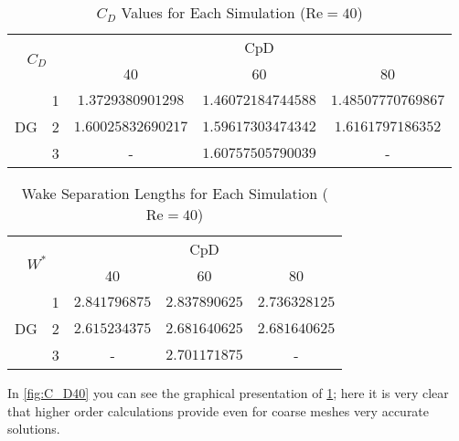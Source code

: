 \begin{table}[htp]
	\centering
	\def\arraystretch{1.5}
		\begin{tabular}{|c|c|c|c|c|}
			\hline
			\multicolumn{2}{|c|}{\multirow{2}{*}{$C_D$}} & \multicolumn{3}{c|}{CpD} \\ \cline{3-5} 
			\multicolumn{2}{|c|}{}                       & 40     & 60    & 80    \\ \hline
			\multirow{3}{*}{DG}            & 1           &   $1.3729380901298$     &     $1.46072184744588$  &     $1.48507770769867$   \\ \cline{2-5} 
			& 2           &     $1.60025832690217$   &   $1.59617303474342$    &     $1.6161797186352$   \\ \cline{2-5} 
			& 3           &      -  &     $1.60757505790039$  &     -   \\ \hline
		\end{tabular}
		\caption[$C_D$ Values for each simulation]{$C_D$ Values for Each Simulation ($\text{Re} = 40$)}	
		\label{C_D40}
	\end{table}
	\begin{table}[htp]
	\centering
	\def\arraystretch{1.5}
		\begin{tabular}{|c|c|c|c|c|}
			\hline
			\multicolumn{2}{|c|}{\multirow{2}{*}{$W^*$}} & \multicolumn{3}{c|}{CpD} \\ \cline{3-5} 
			\multicolumn{2}{|c|}{}                       & 40     & 60    & 80    \\ \hline
			\multirow{3}{*}{DG}            & 1           &    $2.841796875$    &    $2.837890625$   &    $2.736328125$    \\ \cline{2-5} 
			& 2           &     $2.615234375$   &    $2.681640625$   &     $2.681640625$   \\ \cline{2-5} 
			& 3           &     -   &    $2.701171875$   &    -    \\ \hline
		\end{tabular}
		\caption{Wake Separation Lengths for Each Simulation ($\text{Re} = 40$)}	
		\label{W40}
\end{table}
In \cref{fig:C_D40} you can see the graphical presentation of \cref{C_D40}; here it is very clear that higher order calculations provide even for coarse meshes very accurate solutions. \\\indent
